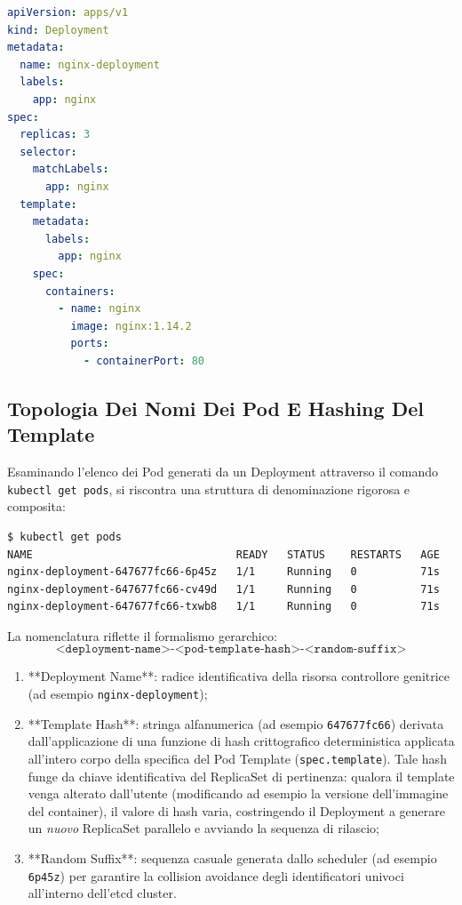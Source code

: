 \documentclass[11pt, a4paper]{article}
\begin{document}
\begin{lstlisting}[language=yaml]
apiVersion: apps/v1
kind: Deployment
metadata:
  name: nginx-deployment
  labels:
    app: nginx
spec:
  replicas: 3
  selector:
    matchLabels:
      app: nginx
  template:
    metadata:
      labels:
        app: nginx
    spec:
      containers:
        - name: nginx
          image: nginx:1.14.2
          ports:
            - containerPort: 80
\end{lstlisting}

\subsection{Topologia Dei Nomi Dei Pod E Hashing Del Template}

Esaminando l'elenco dei Pod generati da un Deployment attraverso il comando \texttt{kubectl get pods}, si riscontra una struttura di denominazione rigorosa e composita:
\begin{lstlisting}[language=bash]
$ kubectl get pods
NAME                                READY   STATUS    RESTARTS   AGE
nginx-deployment-647677fc66-6p45z   1/1     Running   0          71s
nginx-deployment-647677fc66-cv49d   1/1     Running   0          71s
nginx-deployment-647677fc66-txwb8   1/1     Running   0          71s
\end{lstlisting}

La nomenclatura riflette il formalismo gerarchico:
\[
\texttt{<deployment-name>-<pod-template-hash>-<random-suffix>}
\]

\begin{enumerate}[noitemsep]
    \item **Deployment Name**: radice identificativa della risorsa controllore genitrice (ad esempio \texttt{nginx-deployment});
    \item **Template Hash**: stringa alfanumerica (ad esempio \texttt{647677fc66}) derivata dall'applicazione di una funzione di hash crittografico deterministica applicata all'intero corpo della specifica del Pod Template (\texttt{spec.template}). Tale hash funge da chiave identificativa del ReplicaSet di pertinenza: qualora il template venga alterato dall'utente (modificando ad esempio la versione dell'immagine del container), il valore di hash varia, costringendo il Deployment a generare un \emph{nuovo} ReplicaSet parallelo e avviando la sequenza di rilascio;
    \item **Random Suffix**: sequenza casuale generata dallo scheduler (ad esempio \texttt{6p45z}) per garantire la collision avoidance degli identificatori univoci all'interno dell'etcd cluster.
\end{enumerate}
\end{document}
